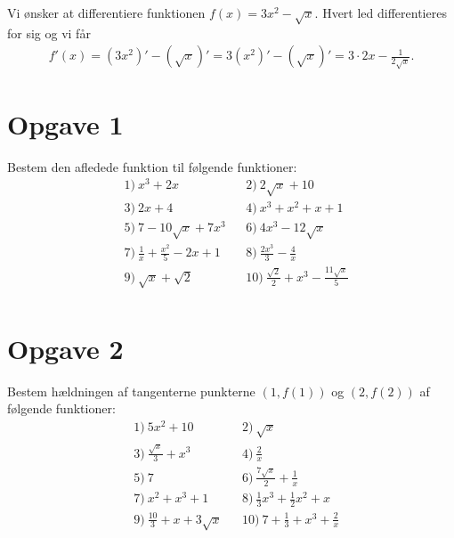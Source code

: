\begin{exa}
Vi ønsker at differentiere funktionen $f(x) = 3x^2-\sqrt{x}$. Hvert led differentieres for sig og vi får
\begin{align*}
f'(x) = (3x^2)' -(\sqrt{x})' = 3(x^2)' - (\sqrt{x})' = 3\cdot 2x - \frac{1}{2\sqrt{x}}.
\end{align*}
\section*{Opgave 1}
Bestem den afledede funktion til følgende funktioner:
\begin{align*}
&1) \ x^3+2x  &&2) \  2\sqrt{x}+10  \\
&3) \ 2x+4  &&4) \ x^3+x^2+x+1   \\
&5) \ 7-10\sqrt{x}+7x^3 &&6) \ 4x^3-12\sqrt{x}    \\
&7) \ \frac{1}{x} + \frac{x^2}{5} -2x +1 &&8) \  \frac{2x^3}{3}-\frac{4}{x}   \\
&9) \ \sqrt{x}+\sqrt{2}  &&10) \  \frac{\sqrt{2}}{2}+x^3-\frac{11\sqrt{x}}{5}  \\
\end{align*}
\section*{Opgave 2}
Bestem hældningen af tangenterne punkterne $(1,f(1))$ og $ (2,f(2))$ af følgende funktioner:
\begin{align*}
&1) \ 5x^2+10   &&2) \ \sqrt{x}    \\
&3) \ \frac{\sqrt{x}}{3} + x^3  &&4) \ \frac{2}{x}   \\
&5) \ 7   &&6) \ \frac{7\sqrt{x}}{2} + \frac{1}{x}   \\
&7) \ x^2+x^3+1  &&8) \ \frac{1}{3}x^3+\frac{1}{2}x^2 + x    \\
&9) \ \frac{10}{3} + x+3\sqrt{x}   &&10) \ 7+\frac{1}{3} + x^3 + \frac{2}{x}    \\
\end{align*} 
\end{exa}